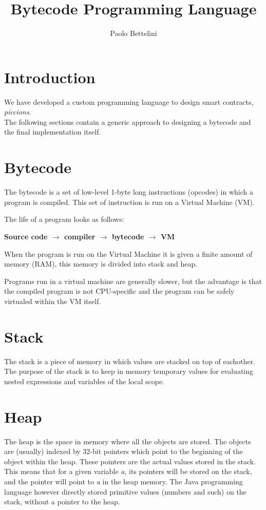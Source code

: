 \documentclass{article}
\title{Bytecode Programming Language}
\author{Paolo Bettelini}
\date{}
\begin{document}
\maketitle
\tableofcontents
\pagebreak

\section{Introduction}

We have developed a custom programming language to design smart contracts, \textit{piccions}.
\\
The following sections contain a generic approach to designing a bytecode
and the final implementation itself.

\section{Bytecode}

The bytecode is a set of low-level 1-byte long instructions (opcodes) in which a program is compiled.
This set of instruction is run on a Virtual Machine (VM).

The life of a program looks as follows:

\begin{center}
\textbf{
    Source code \(\rightarrow\) compiler \(\rightarrow\) bytecode \(\rightarrow\) VM
}
\end{center}

When the program is run on the Virtual Machine it is given a finite amount of memory (RAM),
this memory is divided into stack and heap.

Programs run in a virtual machine are generally slower, but the advantage is that the
compiled program is not CPU-specific and the program can be safely virtualed within the VM itself.

\section{Stack}

The stack is a piece of memory in which values are stacked on top of eachother.
The purpose of the stack is to keep in memory temporary values for evaluating nested expressions and
variables of the local scope.

\section{Heap}

The heap is the space in memory where all the objects are stored.
The objects are (usually) indexed by 32-bit pointers which point to the beginning of the object within the heap.
These pointers are the actual values stored in the stack.
This means that for a given variable \textit{a}, its pointers will be stored on the stack, and the pointer will point to \textit{a} in the heap memory.
The Java programming language however directly stored primitive values (numbers and such) on the stack, without a pointer to the heap.
\end{document}
